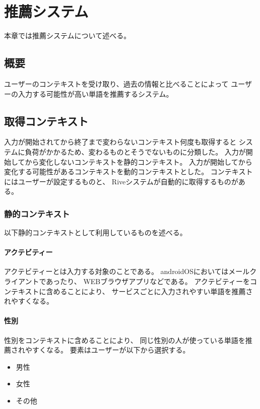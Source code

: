 \chapter{推薦システム}
\label{chap:recommend}
本章では推薦システムについて述べる。

\newpage
\section{概要}
ユーザーのコンテキストを受け取り、過去の情報と比べることによって
ユーザーの入力する可能性が高い単語を推薦するシステム。

\section{取得コンテキスト}
\label{sec:getcontext}
入力が開始されてから終了まで変わらないコンテキスト何度も取得すると
システムに負荷がかかるため、変わるものとそうでないものに分類した。
入力が開始してから変化しないコンテキストを静的コンテキスト。
入力が開始してから変化する可能性があるコンテキストを動的コンテキストとした。
コンテキストにはユーザーが設定するものと、
Riveシステムが自動的に取得するものがある。

\subsection{静的コンテキスト}
\label{staticcontext}
以下静的コンテキストとして利用しているものを述べる。

\subsubsection{アクテビティー}
\label{activity}
アクテビティーとは入力する対象のことである。
androidOSにおいてはメールクライアントであったり、
WEBブラウザアプリなどである。
アクテビティーをコンテキストに含めることにより、
サービスごとに入力されやすい単語を推薦されやすくなる。

\subsubsection{性別}
性別をコンテキストに含めることにより、
同じ性別の人が使っている単語を推薦されやすくなる。
要素はユーザーが以下から選択する。
\begin{itemize}
  \item 男性
  \item 女性
  \item その他
\end{itemize}

